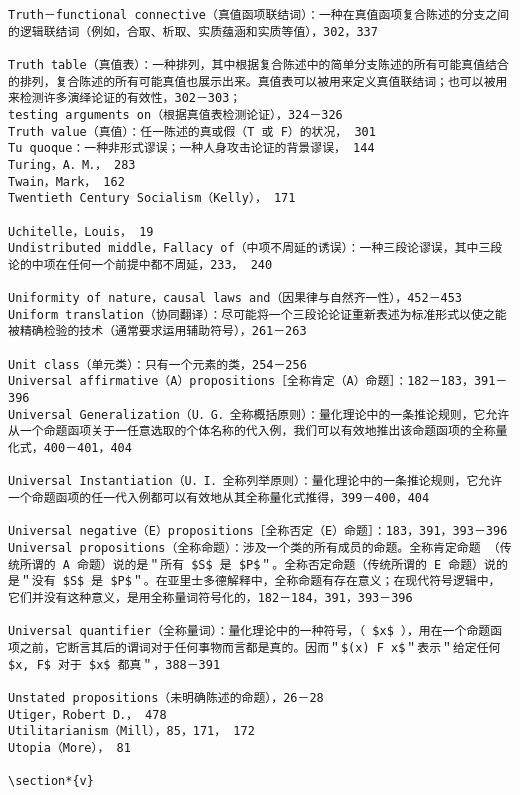 \begin{verbatim}
Truth－functional connective（真值函项联结词）：一种在真值函项复合陈述的分支之间的逻辑联结词（例如，合取、析取、实质蕴涵和实质等值），302，337

Truth table（真值表）：一种排列，其中根据复合陈述中的简单分支陈述的所有可能真值结合的排列，复合陈述的所有可能真值也展示出来。真值表可以被用来定义真值联结词；也可以被用来检测许多演绎论证的有效性，302－303；
testing arguments on（根据真值表检测论证），324－326
Truth value（真值）：任一陈述的真或假（T 或 F）的状况， 301
Tu quoque：一种非形式谬误；一种人身攻击论证的背景谬误， 144
Turing，A．M．， 283
Twain，Mark， 162
Twentieth Century Socialism（Kelly）， 171

Uchitelle，Louis， 19
Undistributed middle，Fallacy of（中项不周延的诱误）：一种三段论谬误，其中三段论的中项在任何一个前提中都不周延，233， 240

Uniformity of nature，causal laws and（因果律与自然齐一性），452－453
Uniform translation（协同翻译）：尽可能将一个三段论论证重新表述为标准形式以使之能被精确检验的技术（通常要求运用辅助符号），261－263

Unit class（单元类）：只有一个元素的类，254－256
Universal affirmative（A）propositions［全称肯定（A）命题］：182－183，391－396
Universal Generalization（U．G．全称概括原则）：量化理论中的一条推论规则，它允许从一个命题函项关于一任意选取的个体名称的代入例，我们可以有效地推出该命题函项的全称量化式，400－401，404

Universal Instantiation（U．I．全称列举原则）：量化理论中的一条推论规则，它允许一个命题函项的任一代入例都可以有效地从其全称量化式推得，399－400，404

Universal negative（E）propositions［全称否定（E）命题］：183，391，393－396
Universal propositions（全称命题）：涉及一个类的所有成员的命题。全称肯定命题 （传统所谓的 A 命题）说的是＂所有 $S$ 是 $P$＂。全称否定命题（传统所谓的 E 命题）说的是＂没有 $S$ 是 $P$＂。在亚里士多德解释中，全称命题有存在意义；在现代符号逻辑中，它们并没有这种意义，是用全称量词符号化的，182－184，391，393－396

Universal quantifier（全称量词）：量化理论中的一种符号，（ $x$ ），用在一个命题函项之前，它断言其后的谓词对于任何事物而言都是真的。因而＂$(x) F x$＂表示＂给定任何 $x, F$ 对于 $x$ 都真＂，388－391

Unstated propositions（未明确陈述的命题），26－28
Utiger，Robert D．， 478
Utilitarianism（Mill），85，171， 172
Utopia（More）， 81

\section*{v}


\end{verbatim}
